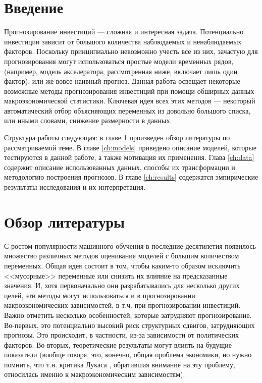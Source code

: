 


\usepackage[title,titletoc]{appendix} %



\thispagestyle{empty} %


\newpage
 \tableofcontents
 \newpage
 
 \chapter*{\textbf{Введение}} 
 Прогнозирование инвестиций --- сложная и интересная задача. Потенциально инвестиции зависит от большого количества наблюдаемых и ненаблюдаемых факторов. Поскольку принципиально невозможно учесть все из них, зачастую для прогнозирования могут использоваться простые модели временных рядов, (например, модель акселератора, рассмотренная ниже, включает лишь один фактор), или же вовсе наивный прогноз. Данная работа освещает некоторые возможные методы прогнозирования инвестиций при помощи обширных данных макроэкономической статистики. Ключевая идея всех этих методов --- некоторый автоматический отбор объясняющих переменных из довольно большого списка, или иными словами, снижение размерности в данных.

 Структура работы следующая: в главе \ref{ch:lit} произведен обзор литературы по рассматриваемой теме. В главе \ref{ch:models} приведено описание моделей, которые тестируются в данной работе, а также мотивация их применения. Глава \ref{ch:data} содержит  описание использованных данных, способы их трансформации и методологию построения прогнозов. В главе \ref{ch:results} содержатся эмпирические результаты исследования и их интерпретация.

 \chapter{Обзор литературы} \label{ch:lit}

 С ростом популярности машинного обучения в последние десятилетия появилось множество различных методов оценивания моделей с большим количеством переменных. Общая идея состоит в том, чтобы каким-то образом исключить  <<мусорные>> переменные или снизить их влияние на предсказанные значения. И, хотя первоначально они разрабатывались для несколько других целей, эти методы могут использоваться и в прогнозировании макроэкономических зависимостей, в т.ч. при прогнозировании инвестиций. Важно отметить несколько особенностей, которые затрудняют прогнозирование. Во-первых, это потенциально высокий риск структурных сдвигов, затрудняющих прогнозы. Это происходит, в частности, из-за зависимости от политических факторов. Во-вторых, теоретические результаты могут влиять на будущие показатели (вообще говоря, это, конечно, общая проблема экономики, но нужно помнить, что т.н. критика Лукаса \cite{lucas1976econometric}, обратившая внимание на эту проблему, относилась именно к макроэкономическим зависимостям).

